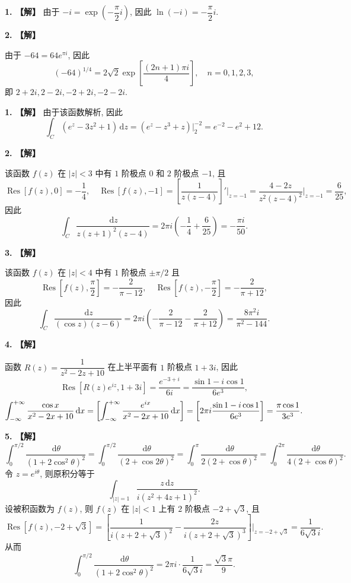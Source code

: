 \documentclass[simple]{hfutexam}
\newcommand{\diff}{\,\mathrm{d}}
\let\Re\relax
\DeclareMathOperator\Re{Re}
\DeclareMathOperator\Res{Res}
\begin{document}
\newpage
{}
\maketitle


\textbf{1. 【解】}
由于 $-i=\exp\left(-\dfrac{\pi}{2}i\right)$, 因此 $\ln(-i)=-\dfrac{\pi}{2}i$.

\textbf{2. 【解】}

由于 $-64=64e^{\pi i}$, 因此
  \[(-64)^{1/4}=2\sqrt{2} \exp\left[\frac{(2n+1)\pi i}{4}\right],\quad n=0,1,2,3,\]
即 $2+2i,2-2i,-2+2i,-2-2i$.


\textbf{1. 【解】}
由于该函数解析, 因此
  \[\int_C(e^z-3z^2+1)\diff z=(e^z-z^3+z)\big|_{2}^{-2}
  =e^{-2}-e^2+12.\]

\textbf{2. 【解】}

该函数 $f(z)$ 在 $|z|<3$ 中有 $1$ 阶极点 $0$ 和 $2$ 阶极点 $-1$, 且
\[\Res[f(z),0]=-\frac{1}{4},\quad
\Res[f(z),-1]=\left[\frac{1}{z(z-4)}\right]'\bigg|_{z=-1}=\frac{4-2z}{z^2(z-4)^2}\bigg|_{z=-1}=\frac{6}{25},\]
因此
\[\int_C\dfrac{\diff z}{z(z+1)^2(z-4)}=2\pi i\left(-\frac{1}{4}+\frac{6}{25}\right)=-\frac{\pi i}{50}.\]

\textbf{3. 【解】}

该函数 $f(z)$ 在 $|z|<4$ 中有 $1$ 阶极点 $\pm\pi/2$ 且
\[\Res[f(z),\frac\pi2]=-\frac{2}{\pi-12},\quad \Res[f(z),-\frac\pi2]=-\frac{2}{\pi+12},\]
因此
\[\int_C\dfrac{\diff z}{(\cos z)(z-6)}=2\pi i\left(-\frac{2}{\pi-12}-\frac{2}{\pi+12}\right)=\frac{8\pi^2i}{\pi^2-144}.\]

\textbf{4. 【解】}

函数 $R(z)=\dfrac{1}{z^2-2z+10}$ 在上半平面有 $1$ 阶极点 $1+3i$, 因此
  \[\Res[R(z)e^{iz},1+3i]=\frac{e^{-3+i}}{6i}=\frac{\sin 1-i\cos 1}{6e^3},\]
  \[\int_{-\infty}^{+\infty}\dfrac{\cos x}{x^2-2x+10}\diff x=\Re \left[\int_{-\infty}^{+\infty} \frac{e^{ix}}{x^2-2x+10}\diff x\right]=\Re \left[2\pi i\frac{\sin 1-i\cos 1}{6e^3}\right]=\frac{\pi\cos1}{3e^3}.\]
  
\textbf{5. 【解】}
\[\int_0^{\pi/2}\dfrac{\diff \theta}{(1+2\cos^2\theta)^2}
=\int_0^{\pi/2}\dfrac{\diff \theta}{(2+\cos 2\theta)^2}
=\int_0^{\pi}\dfrac{\diff \theta}{2(2+\cos \theta)^2}
=\int_0^{2\pi}\dfrac{\diff \theta}{4(2+\cos \theta)^2}.
\]
令 $z=e^{i\theta}$, 则原积分等于
  \[\int_{|z|=1}\frac{z\diff z}{i(z^2+4z+1)^2}.\]
设被积函数为 $f(z)$, 则 $f(z)$ 在 $|z|<1$ 上有 $2$ 阶极点 $-2+\sqrt{3}$, 且
  \[\Res[f(z),-2+\sqrt{3}]=\left[\frac{1}{i(z+2+\sqrt{3})^2}-\frac{2z}{i(z+2+\sqrt{3})^3}\right]\bigg|_{z=-2+\sqrt{3}}=\frac{1}{6\sqrt{3}i}.\]
从而
  \[\int_0^{\pi/2}\dfrac{\diff \theta}{(1+2\cos^2\theta)^2}=2\pi i\cdot \frac{1}{6\sqrt{3}i}=\frac{\sqrt{3} \pi}{9}.\]
\end{document}
